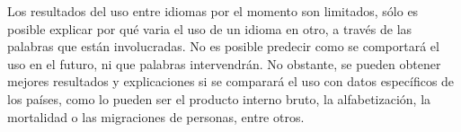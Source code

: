 Los resultados del uso entre idiomas por el momento son limitados, sólo es posible explicar por qué varia el uso de un idioma en otro,  a través de las palabras que están involucradas. No es posible predecir como se comportará el uso en el futuro, ni que palabras intervendrán. No obstante, se pueden obtener mejores resultados y explicaciones si se comparará el uso con datos específicos de los países, como lo pueden ser el producto interno bruto, la alfabetización, la mortalidad o  las migraciones de personas, entre otros.


 



 





